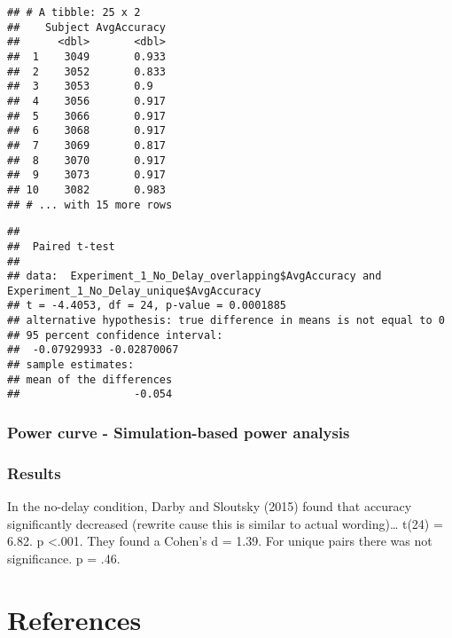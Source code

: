 \documentclass[
  english,
  man]{article}
\newlength{\cslhangindent}
\newlength{\cslentryspacingunit} %
\newenvironment{CSLReferences}[2] %
 {%
  \setlength{\parindent}{0pt}
  \ifodd #1
  \let\oldpar\par
  \def\par{\hangindent=\cslhangindent\oldpar}
  \fi
  \setlength{\parskip}{#2\cslentryspacingunit}
 }%
 {}
\begin{document}
\begin{verbatim}
## # A tibble: 25 x 2
##    Subject AvgAccuracy
##      <dbl>       <dbl>
##  1    3049       0.933
##  2    3052       0.833
##  3    3053       0.9  
##  4    3056       0.917
##  5    3066       0.917
##  6    3068       0.917
##  7    3069       0.817
##  8    3070       0.917
##  9    3073       0.917
## 10    3082       0.983
## # ... with 15 more rows
\end{verbatim}

\begin{verbatim}
## 
##  Paired t-test
## 
## data:  Experiment_1_No_Delay_overlapping$AvgAccuracy and Experiment_1_No_Delay_unique$AvgAccuracy
## t = -4.4053, df = 24, p-value = 0.0001885
## alternative hypothesis: true difference in means is not equal to 0
## 95 percent confidence interval:
##  -0.07929933 -0.02870067
## sample estimates:
## mean of the differences 
##                  -0.054
\end{verbatim}

\hypertarget{power-curve---simulation-based-power-analysis}{%
\subsubsection{Power curve - Simulation-based power analysis}\label{power-curve---simulation-based-power-analysis}}

\hypertarget{results}{%
\subsubsection{Results}\label{results}}

In the no-delay condition, Darby and Sloutsky (2015) found that accuracy significantly decreased (rewrite cause this is similar to actual wording)\ldots{} t(24) = 6.82. p \textless.001. They found a Cohen's d = 1.39. For unique pairs there was not significance. p = .46.

\newpage

\hypertarget{references}{%
\section{References}\label{references}}

\begingroup
\setlength{\parindent}{-0.5in}
\setlength{\leftskip}{0.5in}

\hypertarget{refs}{}
\begin{CSLReferences}{0}{0}
\end{CSLReferences}

\endgroup
\end{document}
